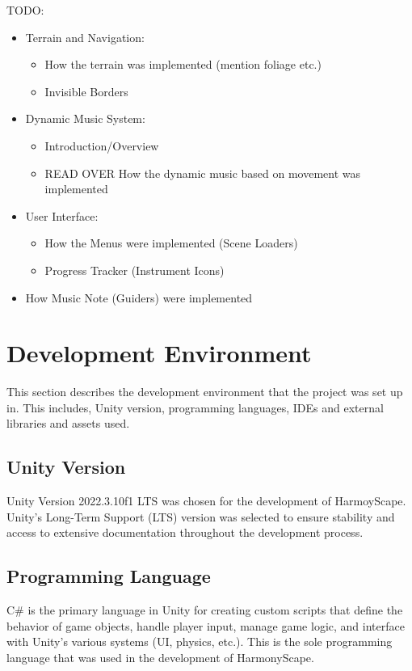 \documentclass{l4proj}
\begin{document}
TODO:
\begin{itemize}
    \item Terrain and Navigation:
    \begin{itemize}
        \item How the terrain was implemented (mention foliage etc.)
        \item Invisible Borders
    \end{itemize}
    \item Dynamic Music System:
    \begin{itemize}
        \item Introduction/Overview
        \item READ OVER How the dynamic music based on movement was implemented
    \end{itemize}
    \item User Interface:
    \begin{itemize}
        \item How the Menus were implemented (Scene Loaders)
        \item Progress Tracker (Instrument Icons)
    \end{itemize}
    \item How Music Note (Guiders) were implemented
\end{itemize}

\newpage

\section{Development Environment}
This section describes the development environment that the project was set up in. This includes, Unity version, programming languages, IDEs and external libraries and assets used.

\subsection{Unity Version}
Unity Version 2022.3.10f1 LTS was chosen for the development of HarmoyScape. Unity's Long-Term Support (LTS) version was selected to ensure stability and access to extensive documentation throughout the development process.

\subsection{Programming Language}
C# is the primary language in Unity for creating custom scripts that define the behavior of game objects, handle player input, manage game logic, and interface with Unity's various systems (UI, physics, etc.). This is the sole programming language that was used in the development of HarmonyScape.
\end{document}
